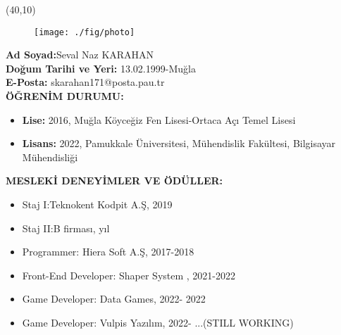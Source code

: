 \vspace{10mm}

\newsavebox{\mysquare}
\savebox{\mysquare}{\textcolor{black}{\rule[2.3pt]{3.4pt}{3.4pt}}}

\setlength{\TPHorizModule}{10pt}
\setlength{\TPVertModule}{10pt}
\begin{textblock}{1}(40,10)
 \begin{figure}[p]
 \texttt{[image: ./fig/photo]}
\end{figure}

\end{textblock}
\textbf{Ad Soyad:}Seval Naz KARAHAN \\

\vspace{-3mm}
\textbf{Do{\u g}um Tarihi ve Yeri:} 13.02.1999-Muğla \\

\vspace{-3mm}
\textbf{E-Posta:} skarahan171@posta.pau.tr \\


\textbf{ÖĞRENİM DURUMU:} 
\vspace{-3mm}
\begin{itemize}
    \item \textbf{Lise:} 2016, Muğla Köyceğiz Fen Lisesi-Ortaca Açı Temel Lisesi
  \item \textbf{Lisans:} 2022, Pamukkale Üniversitesi, Mühendislik Fakültesi, Bilgisayar Mühendisliği
\end{itemize}

\textbf{MESLEKİ DENEYİMLER VE ÖDÜLLER:}   
\vspace{-3mm}
\begin{itemize}
  \item Staj I:Teknokent Kodpit A.Ş, 2019
  \item Staj II:B firması, yıl
  \item Programmer: Hiera Soft A.Ş, 2017-2018
  \item Front-End Developer: Shaper System , 2021-2022
   \item Game Developer: Data Games, 2022- 2022
     \item Game Developer: Vulpis Yazılım, 2022- ...(STILL WORKING)
\end{itemize}


